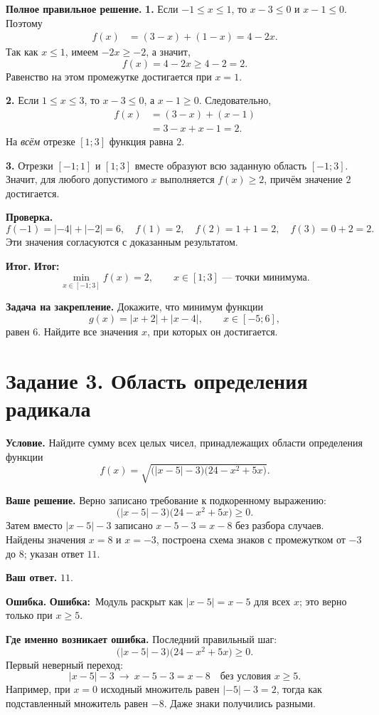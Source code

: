 \documentclass[a4paper,12pt]{article}
\newcommand{\labeltext}[1]{\par\noindent\textbf{\color{ink}#1}\quad}
\newcommand{\err}{\textbf{\color{errorred}Ошибка:}\ }
\newcommand{\result}{\textbf{\color{accent}Итог:}\ }
\begin{document}
\labeltext{Полное правильное решение.}
\textbf{1.} Если $-1\le x\le1$, то $x-3\le0$ и $x-1\le0$. Поэтому
\[
\begin{aligned}
f(x)&=(3-x)+(1-x)=4-2x.
\end{aligned}
\]
Так как $x\le1$, имеем $-2x\ge-2$, а значит,
\[
f(x)=4-2x\ge 4-2=2.
\]
Равенство на этом промежутке достигается при $x=1$.

\textbf{2.} Если $1\le x\le3$, то $x-3\le0$, а $x-1\ge0$. Следовательно,
\[
\begin{aligned}
f(x)&=(3-x)+(x-1)\\
&=3-x+x-1=2.
\end{aligned}
\]
На \emph{всём} отрезке $[1;3]$ функция равна $2$.

\textbf{3.} Отрезки $[-1;1]$ и $[1;3]$ вместе образуют всю заданную область $[-1;3]$. Значит, для любого допустимого $x$ выполняется $f(x)\ge2$, причём значение $2$ достигается.

\labeltext{Проверка.}
\[
f(-1)=|-4|+|-2|=6,\quad f(1)=2,\quad f(2)=1+1=2,\quad f(3)=0+2=2.
\]
Эти значения согласуются с доказанным результатом.

\labeltext{Итог.} \result
\[
\boxed{\min\limits_{x\in[-1;3]} f(x)=2},
\qquad \boxed{x\in[1;3]\text{ --- точки минимума}.}
\]

\labeltext{Задача на закрепление.}
Докажите, что минимум функции
\[
g(x)=|x+2|+|x-4|,\qquad x\in[-5;6],
\]
равен $6$. Найдите все значения $x$, при которых он достигается.
\clearpage

\label{task:3}
\section*{Задание 3. Область определения радикала}
\labeltext{Условие.}
Найдите сумму всех целых чисел, принадлежащих области определения функции
\[
f(x)=\sqrt{\bigl(|x-5|-3\bigr)\bigl(24-x^2+5x\bigr)}.
\]

\labeltext{Ваше решение.}
Верно записано требование к подкоренному выражению:
\[
\bigl(|x-5|-3\bigr)\bigl(24-x^2+5x\bigr)\ge0.
\]
Затем вместо $|x-5|-3$ записано $x-5-3=x-8$ без разбора случаев. Найдены значения $x=8$ и $x=-3$, построена схема знаков с промежутком от $-3$ до $8$; указан ответ $11$.

\labeltext{Ваш ответ.} $11$.

\labeltext{Ошибка.} \err Модуль раскрыт как $|x-5|=x-5$ для всех $x$; это верно только при $x\ge5$.

\labeltext{Где именно возникает ошибка.}
Последний правильный шаг:
\[
\bigl(|x-5|-3\bigr)\bigl(24-x^2+5x\bigr)\ge0.
\]
Первый неверный переход:
\[
|x-5|-3\ \longrightarrow\ x-5-3=x-8
\quad\text{без условия }x\ge5.
\]
Например, при $x=0$ исходный множитель равен $|{-5}|-3=2$, тогда как подставленный множитель равен $-8$. Даже знаки получились разными.
\end{document}
